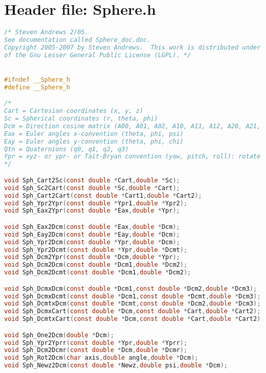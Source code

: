\documentclass[11pt]{article}
\begin{document}
\maketitle

\section{Header file: Sphere.h}

\begin{lstlisting}[language=C]
/* Steven Andrews 2/05.
See documentation called Sphere_doc.doc.
Copyright 2005-2007 by Steven Andrews.  This work is distributed under the terms
of the Gnu Lesser General Public License (LGPL). */


#ifndef __Sphere_h
#define __Sphere_h

/*
Cart = Cartesian coordinates (x, y, z)
Sc = Spherical coordinates (r, theta, phi)
Dcm = Direction cosine matrix (A00, A01, A02, A10, A11, A12, A20, A21, A22)
Eax = Euler angles x-convention (theta, phi, psi)
Eay = Euler angles y-convention (theta, phi, chi)
Qtn = Quaternions (q0, q1, q2, q3)
Ypr = xyz- or ypr- or Tait-Bryan convention (yaw, pitch, roll): rotate on z, then y, then x
*/

void Sph_Cart2Sc(const double *Cart,double *Sc);
void Sph_Sc2Cart(const double *Sc,double *Cart);
void Sph_Cart2Cart(const double *Cart1,double *Cart2);
void Sph_Ypr2Ypr(const double *Ypr1,double *Ypr2);
void Sph_Eax2Ypr(const double *Eax,double *Ypr);

void Sph_Eax2Dcm(const double *Eax,double *Dcm);
void Sph_Eay2Dcm(const double *Eay,double *Dcm);
void Sph_Ypr2Dcm(const double *Ypr,double *Dcm);
void Sph_Ypr2Dcmt(const double *Ypr,double *Dcmt);
void Sph_Dcm2Ypr(const double *Dcm,double *Ypr);
void Sph_Dcm2Dcm(const double *Dcm1,double *Dcm2);
void Sph_Dcm2Dcmt(const double *Dcm1,double *Dcm2);

void Sph_DcmxDcm(const double *Dcm1,const double *Dcm2,double *Dcm3);
void Sph_DcmxDcmt(const double *Dcm1,const double *Dcmt,double *Dcm3);
void Sph_DcmtxDcm(const double *Dcmt,const double *Dcm2,double *Dcm3);
void Sph_DcmxCart(const double *Dcm,const double *Cart,double *Cart2);
void Sph_DcmtxCart(const double *Dcm,const double *Cart,double *Cart2);

void Sph_One2Dcm(double *Dcm);
void Sph_Ypr2Yprr(const double *Ypr,double *Yprr);
void Sph_Dcm2Dcmr(const double *Dcm,double *Dcmr);
void Sph_Rot2Dcm(char axis,double angle,double *Dcm);
void Sph_Newz2Dcm(const double *Newz,double psi,double *Dcm);


\end{lstlisting}
\end{document}
